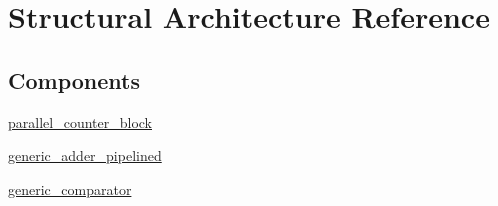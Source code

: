 \hypertarget{classmajority__voter_1_1_structural}{\section{Structural Architecture Reference}
\label{classmajority__voter_1_1_structural}
}
\subsection*{Components}
 \begin{DoxyCompactItemize}
\item 
\hypertarget{classmajority__voter_1_1_structural_ga815ccfeb72ac23e27e677e553338e1e7}{\hyperlink{group___majority_voter_ga815ccfeb72ac23e27e677e553338e1e7}{parallel\+\_\+counter\+\_\+block}  {\bfseries }  }\label{classmajority__voter_1_1_structural_ga815ccfeb72ac23e27e677e553338e1e7}

\item 
\hypertarget{classmajority__voter_1_1_structural_ga29987d7f0a623ac9f1d6412fc136dd29}{\hyperlink{group___majority_voter_ga29987d7f0a623ac9f1d6412fc136dd29}{generic\+\_\+adder\+\_\+pipelined}  {\bfseries }  }\label{classmajority__voter_1_1_structural_ga29987d7f0a623ac9f1d6412fc136dd29}

\item 
\hypertarget{classmajority__voter_1_1_structural_gab477f6800746b156c7ef1bb9dc2547ab}{\hyperlink{group___majority_voter_gab477f6800746b156c7ef1bb9dc2547ab}{generic\+\_\+comparator}  {\bfseries }  }\label{classmajority__voter_1_1_structural_gab477f6800746b156c7ef1bb9dc2547ab}

\end{DoxyCompactItemize}
